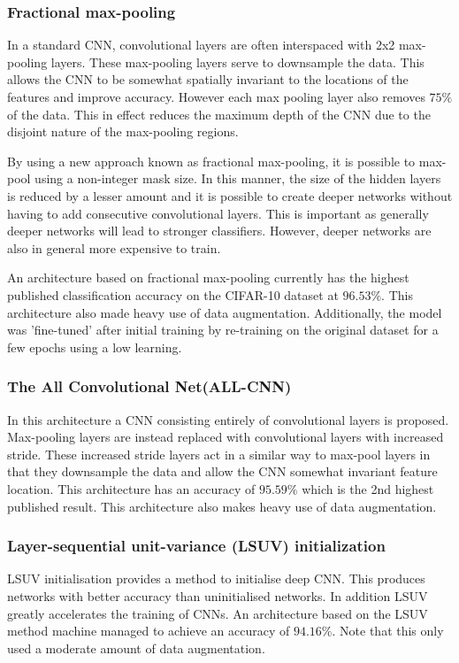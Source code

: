 \subsubsection{Fractional max-pooling}
In a standard CNN, convolutional layers are often interspaced with 2x2 max-pooling layers. These max-pooling layers serve to downsample the data. This allows the CNN to be somewhat spatially invariant to the locations of the features and improve accuracy. However each max pooling layer also removes $75\%$ of the data\cite{graham2014fractional}. This in effect reduces the maximum depth of the CNN due to the disjoint nature of the max-pooling regions.

By using a new approach known as fractional max-pooling, it is possible to max-pool using a non-integer mask size. In this manner, the size of the hidden layers is reduced by a lesser amount and it is possible to create deeper networks without having to add consecutive convolutional layers. This is important as generally deeper networks will lead to stronger classifiers\cite{he2016deep}. However, deeper networks are also in general more expensive to train.

An architecture based on fractional max-pooling currently has the highest published classification accuracy on the CIFAR-10 dataset at $96.53\%$. This architecture also made heavy use of data augmentation. Additionally, the model was 'fine-tuned' after initial training by re-training on the original dataset for a few epochs using a low learning.

\subsubsection{The All Convolutional Net(ALL-CNN)}

In this architecture\cite{springenberg2014striving} a CNN consisting entirely of convolutional layers is proposed. Max-pooling layers are instead replaced with convolutional layers with increased stride. These increased stride layers act in a similar way to max-pool layers in that they downsample the data and allow the CNN somewhat invariant feature location. This architecture has an accuracy of $95.59\%$ which is the 2nd highest published result. This architecture also makes heavy use of data augmentation.

\subsubsection{Layer-sequential unit-variance (LSUV) initialization}
LSUV initialisation provides a method to initialise deep CNN. This produces networks with better accuracy than uninitialised networks. In addition LSUV greatly accelerates the training of CNNs. An architecture based on the LSUV method machine managed to achieve an accuracy of $94.16\%$. Note that this only used a moderate amount of data augmentation.

